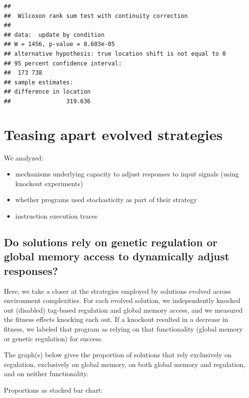 \documentclass[
]{book}
\providecommand{\tightlist}{%
  \setlength{\itemsep}{0pt}\setlength{\parskip}{0pt}}
\begin{document}
\begin{verbatim}
## 
##  Wilcoxon rank sum test with continuity correction
## 
## data:  update by condition
## W = 1456, p-value = 8.603e-05
## alternative hypothesis: true location shift is not equal to 0
## 95 percent confidence interval:
##  173 738
## sample estimates:
## difference in location 
##                319.636
\end{verbatim}

\hypertarget{teasing-apart-evolved-strategies}{%
\section{Teasing apart evolved strategies}\label{teasing-apart-evolved-strategies}}

We analyzed:

\begin{itemize}
\tightlist
\item
  mechanisms underlying capacity to adjust responses to input signals (using knockout experiments)
\item
  whether programs used stochasticity as part of their strategy
\item
  instruction execution traces
\end{itemize}

\hypertarget{do-solutions-rely-on-genetic-regulation-or-global-memory-access-to-dynamically-adjust-responses}{%
\subsection{Do solutions rely on genetic regulation or global memory access to dynamically adjust responses?}\label{do-solutions-rely-on-genetic-regulation-or-global-memory-access-to-dynamically-adjust-responses}}

Here, we take a closer at the strategies employed by solutions evolved across environment complexities.
For each evolved solution, we independently knocked out (disabled) tag-based regulation and global memory access, and we measured the fitness effects knocking each out.
If a knockout resulted in a decrease in fitness, we labeled that program as relying on that functionality (global memory or genetic regulation) for success.

The graph(s) below gives the proportion of solutions that rely exclusively on regulation, exclusively on global memory, on both global memory and regulation, and on neither functionality.

Proportions as stacked bar chart:
\end{document}
